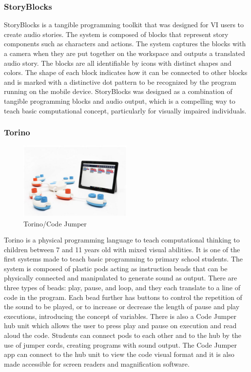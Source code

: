 \documentclass[oneside,%
                    author={Malak Hajji},
                    degree={BSc},
                    title={Designing An Accessible Computational Toolkit For Students},
                  subtitle={With Mixed Visual Abilities}]{dissertation}
\begin{document}
\subsubsection{StoryBlocks}
StoryBlocks\cite{storyblocks} is a tangible programming toolkit that was designed for VI users to create audio stories. The system is composed of blocks that represent story components such as characters and actions. The system captures the blocks with a camera when they are put together on the workspace and outputs a translated audio story. The blocks are all identifiable by icons with distinct shapes and colors. The shape of each block indicates how it can be connected to other blocks and is marked with a distinctive dot pattern to be recognized by the program running on the mobile device. StoryBlocks was designed as a combination of tangible programming blocks and audio output, which is a compelling way to teach basic computational concept, particularly for visually impaired individuals.

\subsubsection{Torino}
\begin{figure}
    \centering
    \includegraphics[width=0.5\textwidth]{thesis/torino.eps}
    \caption{Torino/Code Jumper\cite{torino}}
    \label{fig-torino}
\end{figure}
Torino\cite{torino} is a physical programming language to teach computational thinking to children between 7 and 11 years old with mixed visual abilities. It is one of the first systems made to teach basic programming to primary school students. The system is composed of plastic pods acting as instruction beads that can be physically connected and manipulated to generate sound as output. There are three types of beads: play, pause, and loop, and they each translate to a line of code in the program. Each bead further has buttons to control the repetition of the sound to be played, or to increase or decrease the length of pause and play executions, introducing the concept of variables. There is also a Code Jumper hub unit which allows the user to press play and pause on execution and read aloud the code. Students can connect pods to each other and to the hub by the use of jumper cords, creating programs with sound output. The Code Jumper app can connect to the hub unit to view the code visual format and it is also made accessible for screen readers and magnification software.  
\end{document}
